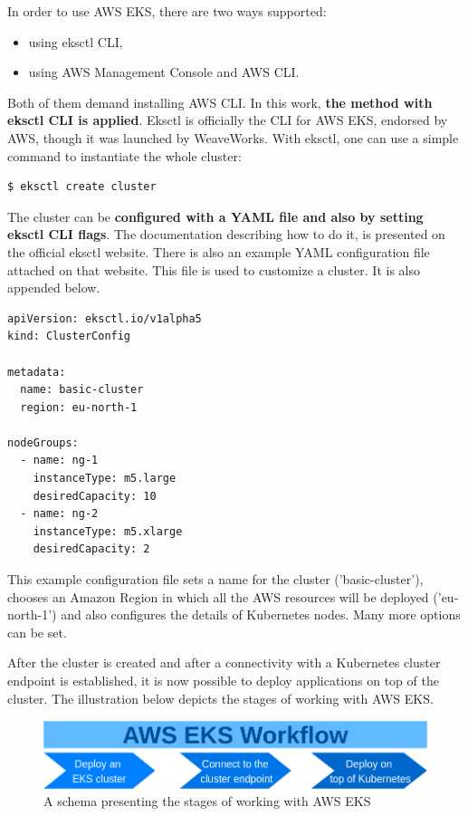 In order to use AWS EKS, there are two ways supported:
\begin{itemize}
\item using eksctl CLI,
\item using AWS Management Console and AWS CLI.
\end{itemize}

Both of them demand installing AWS CLI. In this work, \textbf{the method with eksctl CLI is applied}. Eksctl is officially the CLI for AWS EKS, endorsed by AWS, though it was launched by WeaveWorks. With eksctl, one can use a simple command to instantiate the whole cluster\cite{eks-cli-official}:
\begin{lstlisting}[basicstyle=\small,caption={A command of eksctl CLI tool used to create a Kubernetes cluster},captionpos=b,language=Bash,xleftmargin=1cm]
$ eksctl create cluster
\end{lstlisting}

The cluster can be \textbf{configured with a YAML file and also by setting eksctl CLI flags}. The documentation describing how to do it, is presented on the official eksctl website\cite{eksctl}. There is also an example YAML configuration file attached on that website. This file is used to customize a cluster. It is also appended below.

\begin{lstlisting}[basicstyle=\tiny,caption={An example YAML file used to customize a Kubernetes cluster created with eksctl CLI tool\cite{eksctl}},captionpos=b,language=Bash,xleftmargin=1cm]
apiVersion: eksctl.io/v1alpha5
kind: ClusterConfig

metadata:
  name: basic-cluster
  region: eu-north-1

nodeGroups:
  - name: ng-1
    instanceType: m5.large
    desiredCapacity: 10
  - name: ng-2
    instanceType: m5.xlarge
    desiredCapacity: 2
\end{lstlisting}

This example configuration file sets a name for the cluster ('basic-cluster'), chooses an Amazon Region in which all the AWS resources will be deployed ('eu-north-1') and also configures the details of Kubernetes nodes. Many more options can be set.

After the cluster is created and after a connectivity with a Kubernetes cluster endpoint is established, it is now possible to deploy applications on top of the cluster. The illustration below depicts the stages of working with AWS EKS.
\begin{figure}[H]
    \centering
    \includegraphics[width=12cm]{figures/eks-workflow.png}
    \captionsetup{justification=centering,margin=2cm}
    \caption{A schema presenting the stages of working with AWS EKS}
\end{figure}

